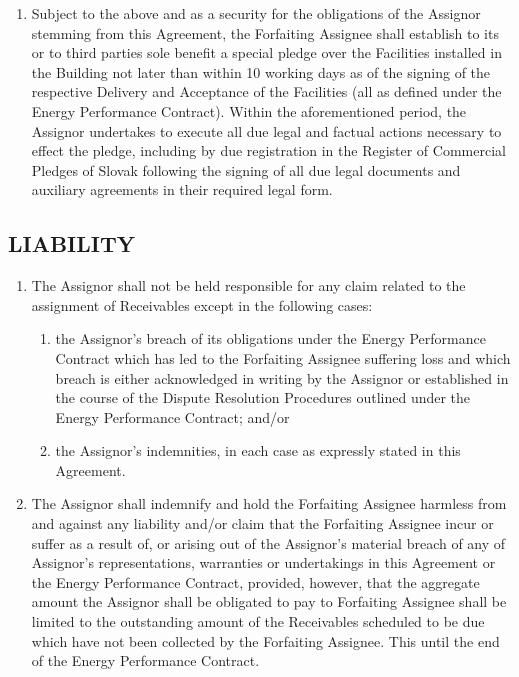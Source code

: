 \documentclass[a4paper]{article}
\begin{document}
\begin{multicols}{2}
\begin{enumerate}
  \item{Subject to the above and as a security for the obligations of
      the Assignor stemming from this Agreement, the Forfaiting
      Assignee shall establish to its or to third parties sole benefit
      a special pledge over the Facilities installed in the Building
      not later than within 10 working days as of the signing of the
      respective Delivery and Acceptance of the Facilities (all as
      defined under the Energy Performance Contract). Within the
      aforementioned period, the Assignor undertakes to execute all
      due legal and factual actions necessary to effect the pledge,
      including by due registration in the Register of Commercial
      Pledges of Slovak following the signing of all due legal
      documents and auxiliary agreements in their required legal
      form.}
  \end{enumerate}

  \subsection{LIABILITY}

  \begin{enumerate}
  \item{The Assignor shall not be held responsible for any claim
      related to the assignment of Receivables except in the following
      cases: }
    \begin{enumerate}
    \item{the Assignor’s breach of its obligations under the Energy
        Performance Contract which has led to the Forfaiting Assignee
        suffering loss and which breach is either acknowledged in
        writing by the Assignor or established in the course of the
        Dispute Resolution Procedures outlined under the Energy
        Performance Contract; and/or}

    \item{the Assignor’s indemnities, in each case as expressly
        stated in this Agreement.}
    \end{enumerate}

  \item{The Assignor shall indemnify and hold the Forfaiting Assignee
      harmless from and against any liability and/or claim that the
      Forfaiting Assignee incur or suffer as a result of, or arising
      out of the Assignor’s material breach of any of Assignor’s
      representations, warranties or undertakings in this Agreement or
      the Energy Performance Contract, provided, however, that the
      aggregate amount the Assignor shall be obligated to pay to
      Forfaiting Assignee shall be limited to the outstanding amount
      of the Receivables scheduled to be due which have not been
      collected by the Forfaiting Assignee. This until the end of the
      Energy Performance Contract.}


\end{enumerate}
\end{multicols}
\end{document}
